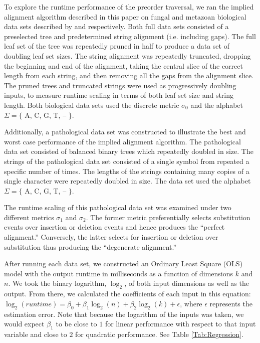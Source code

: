 \documentclass[11pt]{article}
\begin{document}
To explore the runtime performance of the preorder traversal, we ran the implied alignment algorithm described in this paper on fungal and metazoan biological data sets described by \cite{GiribetandWheeler1999} and \cite{GiribetandWheeler2001} respectively.
Both full data sets consisted of a preselected tree and predetermined string alignment (i.e. including gaps).
The full leaf set of the tree was repeatedly pruned in half to produce a data set of doubling leaf set sizes.
The string alignment was repeatedly truncated, dropping the beginning and end of the alignment, taking the central slice of the correct length from each string, and then removing all the gaps from the alignment slice.
The pruned trees and truncated strings were used as progressively doubling inputs, to measure runtime scaling in terms of both leaf set size and string length.
Both biological data sets used the discrete metric $\sigma_0$ and the alphabet $\Sigma = \{$ A, C, G, T, -- $\}$.

Additionally, a pathological data set was constructed to illustrate the best and worst case performance of the implied alignment algorithm.
The pathological data set consisted of balanced binary trees which repeatedly doubled in size.
The strings of the pathological data set consisted of a single symbol from repeated a specific number of times.
The lengths of the strings containing many copies of a single character were repeatedly doubled in size.
The data set used the alphabet $\Sigma = \{$ A, C, G, T, -- $\}$.

The runtime scaling of this pathological data set was examined under two different metrics $\sigma_1$ and $\sigma_2$.
The former metric preferentially selects substitution events over insertion or deletion events and hence produces the ``perfect alignment.''
Conversely, the latter selects for insertion or deletion over substitution thus producing the ``degenerate alignment.''


After running each data set, we constructed an Ordinary Least Square (OLS) model with the output runtime in milliseconds as a function of dimensions $k$ and $n$.
We took the binary logarithm, $\log_{2}$, of both input dimensions as well as the output.
From there, we calculated the coefficients of each input in this equation: $\log_2(runtime) = \beta_0 + \beta_1 \log_2(n) + \beta_2 \log_2(k) + \epsilon$, where $\epsilon$ represents the estimation error.
Note that because the logarithm of the inputs was taken, we would expect $\beta_1$ to be close to $1$ for linear performance with respect to that input variable and close to $2$ for quadratic performance.
See Table \ref{Tab:Regression}.
\end{document}
